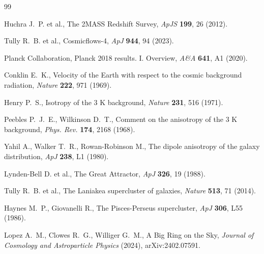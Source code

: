 \documentclass[11pt,a4paper]{article}
\begin{document}
\begin{thebibliography}{99}

Huchra J.~P. et al.,
\newblock The 2MASS Redshift Survey,
\newblock \emph{ApJS} \textbf{199}, 26 (2012).

Tully R.~B. et al.,
\newblock Cosmicflows-4,
\newblock \emph{ApJ} \textbf{944}, 94 (2023).

Planck Collaboration,
\newblock Planck 2018 results. I. Overview,
\newblock \emph{A\&A} \textbf{641}, A1 (2020).

Conklin E.~K.,
\newblock Velocity of the Earth with respect to the cosmic background radiation,
\newblock \emph{Nature} \textbf{222}, 971 (1969).

Henry P.~S.,
\newblock Isotropy of the 3 K background,
\newblock \emph{Nature} \textbf{231}, 516 (1971).

Peebles P.~J.~E., Wilkinson D.~T.,
\newblock Comment on the anisotropy of the 3 K background,
\newblock \emph{Phys. Rev.} \textbf{174}, 2168 (1968).

Yahil A., Walker T.~R., Rowan-Robinson M.,
\newblock The dipole anisotropy of the galaxy distribution,
\newblock \emph{ApJ} \textbf{238}, L1 (1980).

Lynden-Bell D. et al.,
\newblock The Great Attractor,
\newblock \emph{ApJ} \textbf{326}, 19 (1988).

Tully R.~B. et al.,
\newblock The Laniakea supercluster of galaxies,
\newblock \emph{Nature} \textbf{513}, 71 (2014).

Haynes M.~P., Giovanelli R.,
\newblock The Pisces-Perseus supercluster,
\newblock \emph{ApJ} \textbf{306}, L55 (1986).

Lopez A.~M., Clowes R.~G., Williger G.~M.,
\newblock A Big Ring on the Sky,
\newblock \emph{Journal of Cosmology and Astroparticle Physics} (2024),
\newblock arXiv:2402.07591.

\end{thebibliography}
\end{document}
